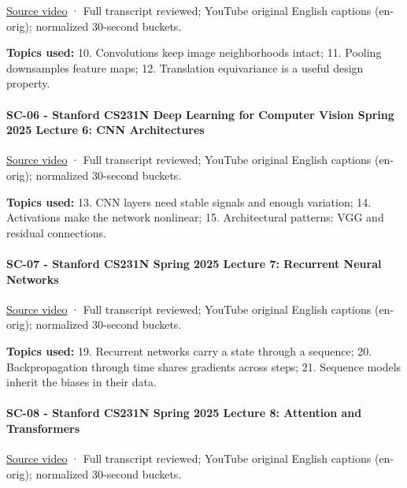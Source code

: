 \href{https://www.youtube.com/watch?v=f3g1zGdxptI}{Source video} · Full transcript reviewed; YouTube original English captions (en-orig); normalized 30-second buckets.

\textbf{Topics used:} 10. Convolutions keep image neighborhoods intact; 11. Pooling downsamples feature maps; 12. Translation equivariance is a useful design property.

\paragraph{SC-06 - Stanford CS231N Deep Learning for Computer Vision Spring 2025 Lecture 6: CNN Architectures}\label{sc-06---stanford-cs231n-deep-learning-for-computer-vision-spring-2025-lecture-6-cnn-architectures}

\href{https://www.youtube.com/watch?v=aVJy4O5TOk8}{Source video} · Full transcript reviewed; YouTube original English captions (en-orig); normalized 30-second buckets.

\textbf{Topics used:} 13. CNN layers need stable signals and enough variation; 14. Activations make the network nonlinear; 15. Architectural patterns: VGG and residual connections.

\paragraph{SC-07 - Stanford CS231N Spring 2025 Lecture 7: Recurrent Neural Networks}\label{sc-07---stanford-cs231n-spring-2025-lecture-7-recurrent-neural-networks}

\href{https://www.youtube.com/watch?v=kG2lAPBF7zA}{Source video} · Full transcript reviewed; YouTube original English captions (en-orig); normalized 30-second buckets.

\textbf{Topics used:} 19. Recurrent networks carry a state through a sequence; 20. Backpropagation through time shares gradients across steps; 21. Sequence models inherit the biases in their data.

\paragraph{SC-08 - Stanford CS231N Spring 2025 Lecture 8: Attention and Transformers}\label{sc-08---stanford-cs231n-spring-2025-lecture-8-attention-and-transformers}

\href{https://www.youtube.com/watch?v=RQowiOF_FvQ}{Source video} · Full transcript reviewed; YouTube original English captions (en-orig); normalized 30-second buckets.


